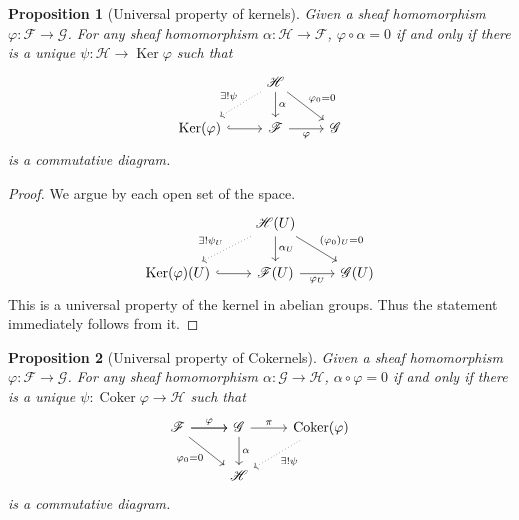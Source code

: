 \documentclass{article}
\newtheorem{proposition}{Proposition}[section]
\numberwithin{equation}{section}
\DeclareMathOperator{\Ker}{Ker}
\DeclareMathOperator{\Coker}{Coker}
\begin{document}
\begin{proposition}[Universal property of kernels]
Given a sheaf homomorphism $\varphi:\mathcal{F}\to\mathcal{G}$. For any sheaf homomorphism $\alpha:\mathcal{H}\to\mathcal{F}$, $\varphi\circ\alpha = 0$ if and only if there is a unique $\psi:\mathcal{H}\to\Ker\varphi$ such that
\[
\begin{tikzcd}
                                        & \mathcal{H} \arrow[d, "\alpha"] \arrow[rd, "\varphi_0=0"] \arrow[ld, "\exists!\psi"', dotted] &             \\
\Ker(\mathcal{\varphi}) \arrow[r, hook] & \mathcal{F} \arrow[r, "\varphi"']                                                           & \mathcal{G}
\end{tikzcd}
\]
is a commutative diagram.
\end{proposition}
\begin{proof}
We argue by each open set of the space.
\[
\begin{tikzcd}
                                        & \mathcal{H}(U) \arrow[d, "\alpha_U"] \arrow[rd, "(\varphi_0)_U=0"] \arrow[ld, "\exists!\psi_U"', dotted] &             \\
\Ker(\mathcal{\varphi})(U) \arrow[r, hook] & \mathcal{F}(U) \arrow[r, "\varphi_U"']                                                           & \mathcal{G}(U)
\end{tikzcd}
\]
This is a universal property of the kernel in abelian groups. Thus the statement immediately follows from it.
\end{proof}

\begin{proposition}[Universal property of Cokernels]
Given a sheaf homomorphism $\varphi:\mathcal{F}\to\mathcal{G}$. For any sheaf homomorphism $\alpha:\mathcal{G}\to\mathcal{H}$, $\alpha\circ\varphi = 0$ if and only if there is a unique $\psi:\Coker\varphi\to\mathcal{H}$ such that
\[
\begin{tikzcd}
\mathcal{F} \arrow[r, "\varphi"] \arrow[r] \arrow[rd, "\varphi_0=0"'] & \mathcal{G} \arrow[r,"\pi"] \arrow[d, "\alpha"]                 & \Coker(\varphi) \arrow[ld, "\exists!\psi"', dotted, swap]\\
                                                                    & \mathcal{H}  &                
\end{tikzcd}
\]
is a commutative diagram.
\end{proposition}
\end{document}
